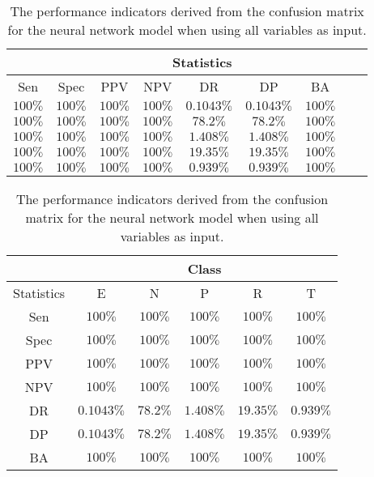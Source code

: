 \begin{table}[!ht]
	\centering
	\begin{tabular}{|c|c|c|c|c|c|c|c|c|}
		\hline
		 & \multicolumn{7}{c|}{Statistics} \\ \hline
		Sen & Spec & PPV & NPV & DR & DP & BA \\ \hline
		$100\%$ & $100\%$ & $100\%$ & $100\%$ & $0.1043\%$ & $0.1043\%$ & $100\%$ \\ \hline
		$100\%$ & $100\%$ & $100\%$ & $100\%$ & $78.2\%$ & $78.2\%$ & $100\%$ \\ \hline
		$100\%$ & $100\%$ & $100\%$ & $100\%$ & $1.408\%$ & $1.408\%$ & $100\%$ \\ \hline
		$100\%$ & $100\%$ & $100\%$ & $100\%$ & $19.35\%$ & $19.35\%$ & $100\%$ \\ \hline
		$100\%$ & $100\%$ & $100\%$ & $100\%$ & $0.939\%$ & $0.939\%$ & $100\%$ \\ \hline
	\end{tabular}
	\caption{The performance indicators derived from the confusion matrix for the neural network model when using all variables as input.}
	\label{tab:cs:all:nnet}
\end{table}

\begin{table}[!ht]
	\centering
	\begin{tabular}{|c|c|c|c|c|c|}
		\hline
		 & \multicolumn{5}{c|}{Class} \\ \hline
		Statistics & E & N & P & R & T \\ \hline
		Sen & $100\%$ & $100\%$ & $100\%$ & $100\%$ & $100\%$ \\ \hline
		Spec & $100\%$ & $100\%$ & $100\%$ & $100\%$ & $100\%$ \\ \hline
		PPV & $100\%$ & $100\%$ & $100\%$ & $100\%$ & $100\%$ \\ \hline
		NPV & $100\%$ & $100\%$ & $100\%$ & $100\%$ & $100\%$ \\ \hline
		DR & $0.1043\%$ & $78.2\%$ & $1.408\%$ & $19.35\%$ & $0.939\%$ \\ \hline
		DP & $0.1043\%$ & $78.2\%$ & $1.408\%$ & $19.35\%$ & $0.939\%$ \\ \hline
		BA & $100\%$ & $100\%$ & $100\%$ & $100\%$ & $100\%$ \\ \hline
	\end{tabular}
	\caption{The performance indicators derived from the confusion matrix for the neural network model when using all variables as input.}
	\label{tab:cs:reverse:all:nnet}
\end{table}

